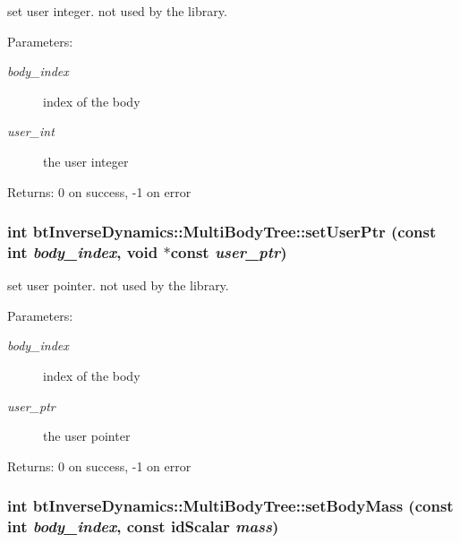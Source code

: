 set user integer. not used by the library. \begin{Desc}
\item[Parameters:]
\begin{description}
\item[{\em body\_\-index}]index of the body \item[{\em user\_\-int}]the user integer \end{description}
\end{Desc}
\begin{Desc}
\item[Returns:]0 on success, -1 on error \end{Desc}
\hypertarget{classbt_inverse_dynamics_1_1_multi_body_tree_d2c37fb7a6cb73b1af87e0b7884717c0}{
\subsubsection[setUserPtr]{\setlength{\rightskip}{0pt plus 5cm}int btInverseDynamics::MultiBodyTree::setUserPtr (const int {\em body\_\-index}, \/  void $\ast$const  {\em user\_\-ptr})}}
\label{classbt_inverse_dynamics_1_1_multi_body_tree_d2c37fb7a6cb73b1af87e0b7884717c0}


set user pointer. not used by the library. \begin{Desc}
\item[Parameters:]
\begin{description}
\item[{\em body\_\-index}]index of the body \item[{\em user\_\-ptr}]the user pointer \end{description}
\end{Desc}
\begin{Desc}
\item[Returns:]0 on success, -1 on error \end{Desc}
\hypertarget{classbt_inverse_dynamics_1_1_multi_body_tree_aec1f7c8093f74529f49e7b36bc59ed7}{
\subsubsection[setBodyMass]{\setlength{\rightskip}{0pt plus 5cm}int btInverseDynamics::MultiBodyTree::setBodyMass (const int {\em body\_\-index}, \/  const idScalar {\em mass})}}
\label{classbt_inverse_dynamics_1_1_multi_body_tree_aec1f7c8093f74529f49e7b36bc59ed7}



